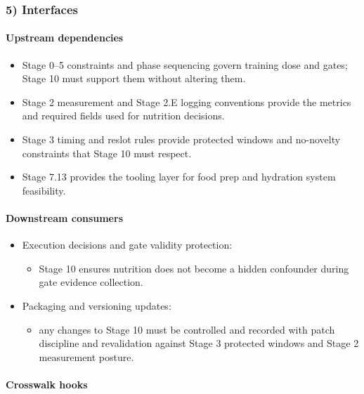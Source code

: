 \documentclass[10pt]{article}
\begin{document}
\subsubsection*{5) Interfaces}

\paragraph*{Upstream dependencies}

\begin{itemize}
\item Stage 0–5 constraints and phase sequencing govern training dose and gates; Stage 10 must support them without altering them.
\item Stage 2 measurement and Stage 2.E logging conventions provide the metrics and required fields used for nutrition decisions.
\item Stage 3 timing and reslot rules provide protected windows and no-novelty constraints that Stage 10 must respect.
\item Stage 7.13 provides the tooling layer for food prep and hydration system feasibility.
\end{itemize}

\paragraph*{Downstream consumers}

\begin{itemize}
\item Execution decisions and gate validity protection:
  \begin{itemize}
  \item Stage 10 ensures nutrition does not become a hidden confounder during gate evidence collection.
  \end{itemize}
\item Packaging and versioning updates:
  \begin{itemize}
  \item any changes to Stage 10 must be controlled and recorded with patch discipline and revalidation against Stage 3 protected windows and Stage 2 measurement posture.
  \end{itemize}
\end{itemize}

\paragraph*{Crosswalk hooks}
\end{document}
